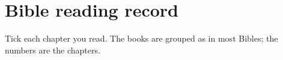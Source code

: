 \chapter{Bible reading record}

Tick each chapter you read. The books are grouped as in most Bibles; the
numbers are the chapters.

\leituradabiblia
